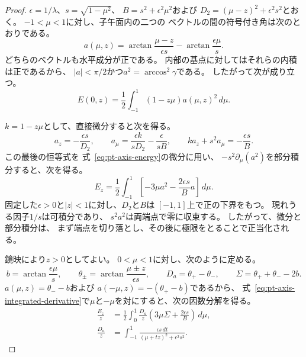 \begin{proof}
$\epsilon=1/\lambda$、$s=\sqrt{1-\mu^2}$、
$B=s^2+\epsilon^2\mu^2$および
$D_2=(\mu-z)^2+\epsilon^2s^2$とおく。
$-1<\mu<1$に対し、子午面内の二つの
ベクトルの間の符号付き角は次のとおりである。
\begin{equation}
 a(\mu,z)=
 \arctan\frac{\mu-z}{\epsilon s}
 -\arctan\frac{\epsilon\mu}{s}.
\label{eq:pt-signed-meridional-angle}
\end{equation}
どちらのベクトルも水平成分が正である。
内部の基点に対してはそれらの内積は正であるから、
$|a|<\pi/2$かつ$a^2=\arccos^2\gamma$である。
したがって次が成り立つ。
\begin{equation}
 E(0,z)=\frac12\int_{-1}^1(1-z\mu)a(\mu,z)^2\,d\mu.
\label{eq:pt-axis-energy}
\end{equation}

$k=1-z\mu$として、直接微分すると次を得る。
\begin{equation}
 a_z=-\frac{\epsilon s}{D_2},\qquad
 a_\mu=\frac{\epsilon k}{sD_2}-\frac{\epsilon}{sB},
 \qquad
 ka_z+s^2a_\mu=-\frac{\epsilon s}{B}.
\label{eq:pt-axis-transport-identity}
\end{equation}
この最後の恒等式を
式~\eqref{eq:pt-axis-energy}の微分に用い、
$-s^2\partial_\mu(a^2)$を部分積分すると、次を得る。
\begin{equation}
 E_z=\frac12\int_{-1}^1
       \left[-3\mu a^2-\frac{2\epsilon s}{B}a\right]\,d\mu .
\label{eq:pt-axis-integrated-derivative}
\end{equation}
固定した$\epsilon>0$と$|z|<1$に対し、$D_2$と$B$は
$[-1,1]$上で正の下界をもつ。
現れうる因子$1/s$は可積分であり、
$s^2a^2$は両端点で零に収束する。
したがって、微分と部分積分は、
まず端点を切り落とし、その後に極限をとることで正当化される。

鏡映により$z>0$としてよい。
$0<\mu<1$に対し、次のように定める。
\[
 b=\arctan\frac{\epsilon\mu}{s},\qquad
 \theta_\pm=\arctan\frac{\mu\pm z}{\epsilon s},\qquad
 D_a=\theta_+-\theta_-,\qquad
 \Sigma=\theta_++\theta_--2b .
\]
$a(\mu,z)=\theta_--b$および
$a(-\mu,z)=-(\theta_+-b)$であるから、
式~\eqref{eq:pt-axis-integrated-derivative}で$\mu$と$-\mu$を対にすると、次の因数分解を得る。
\begin{equation}
\begin{aligned}
 \frac{E_z}{z}
 &=\frac12\int_0^1\frac{D_a}{z}
          \left(3\mu\Sigma+\frac{2\epsilon s}{B}\right)\,d\mu,\\
 \frac{D_a}{z}
 &=\int_{-1}^1
   \frac{\epsilon s\,dt}{(\mu+tz)^2+\epsilon^2s^2}.
\end{aligned}
\label{eq:pt-axis-reflected-factorization}
\end{equation}


\end{proof}
